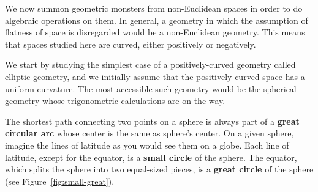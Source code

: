 We now summon geometric monsters from non-Euclidean spaces in order to do algebraic operations on them. In general, a geometry in which the assumption of flatness of space is disregarded would be a non-Euclidean geometry. This means that spaces studied here are curved, either positively or negatively.

We start by studying the simplest case of a positively-curved geometry called elliptic geometry, and we initially assume that the positively-curved space has a uniform curvature. The most accessible such geometry would be the spherical geometry whose trigonometric calculations are on the way. 

\begin{tcolorbox}[title={Great Circular Arcs on a Sphere}]
\begin{question}
The shortest path connecting two points on a sphere is always part of a \textbf{great circular arc} whose center is the same as sphere's center. On a given sphere, imagine the lines of latitude as you would see them on a globe. Each line of latitude, except for the equator, is a \textbf{small circle} of the sphere. The equator, which splits the sphere into two equal-sized pieces, is a \textbf{great circle} of the sphere (see Figure~\ref{fig:small-great}).


\begin{figure}[H]
    \centering
\end{figure}
\end{question}
\end{tcolorbox}
